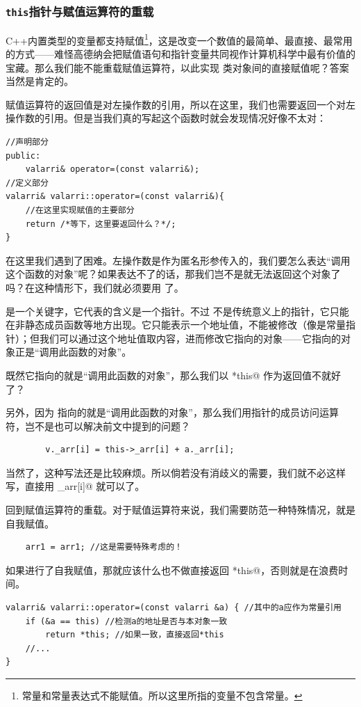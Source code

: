\subsubsection*{\texttt{this}指针与赋值运算符的重载}
C++内置类型的变量都支持赋值\footnote{常量和常量表达式不能赋值。所以这里所指的变量不包含常量。}，这是改变一个数值的最简单、最直接、最常用的方式——难怪高德纳会把赋值语句和指针变量共同视作计算机科学中最有价值的宝藏。那么我们能不能重载赋值运算符，以此实现 \lstinline@valarri@ 类对象间的直接赋值呢？答案当然是肯定的。\par
赋值运算符的返回值是对左操作数的引用，所以在这里，我们也需要返回一个对左操作数的引用。但是当我们真的写起这个函数时就会发现情况好像不太对：
\begin{lstlisting}
//声明部分
public:
    valarri& operator=(const valarri&);
//定义部分
valarri& valarri::operator=(const valarri&){
    //在这里实现赋值的主要部分
    return /*等下，这里要返回什么？*/;
}
\end{lstlisting}
在这里我们遇到了困难。左操作数是作为匿名形参传入的，我们要怎么表达``调用这个函数的对象''呢？如果表达不了的话，那我们岂不是就无法返回这个对象了吗？在这种情形下，我们就必须要用 \lstinline@this@ 了。\par
\lstinline@this@ 是一个关键字，它代表的含义是一个指针。不过 \lstinline@this@ 不是传统意义上的指针，它只能在非静态成员函数等地方出现。它只能表示一个地址值，不能被修改（像是常量指针）；但我们可以通过这个地址值取内容，进而修改它指向的对象——它指向的对象正是``调用此函数的对象''。\par
既然它指向的就是``调用此函数的对象''，那么我们以 \lstinline@*this@ 作为返回值不就好了？\par
另外，因为 \lstinline@this@ 指向的就是``调用此函数的对象''，那么我们用指针的成员访问运算符，岂不是也可以解决前文中提到的问题？
\begin{lstlisting}
        v._arr[i] = this->_arr[i] + a._arr[i];
\end{lstlisting}
当然了，这种写法还是比较麻烦。所以倘若没有消歧义的需要，我们就不必这样写，直接用 \lstinline@_arr[i]@ 就可以了。\par
回到赋值运算符的重载。对于赋值运算符来说，我们需要防范一种特殊情况，就是自我赋值。
\begin{lstlisting}
    arr1 = arr1; //这是需要特殊考虑的！
\end{lstlisting}
如果进行了自我赋值，那就应该什么也不做直接返回 \lstinline@*this@，否则就是在浪费时间。
\begin{lstlisting}
valarri& valarri::operator=(const valarri &a) { //其中的a应作为常量引用
    if (&a == this) //检测a的地址是否与本对象一致
        return *this; //如果一致，直接返回*this
    //...
}
\end{lstlisting}\par
